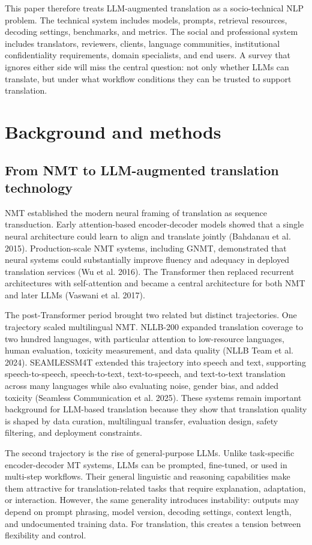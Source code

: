 \documentclass[11pt]{article}
\begin{document}
This paper therefore treats LLM-augmented translation as a socio-technical NLP problem. The technical system includes models, prompts, retrieval resources, decoding settings, benchmarks, and metrics. The social and professional system includes translators, reviewers, clients, language communities, institutional confidentiality requirements, domain specialists, and end users. A survey that ignores either side will miss the central question: not only whether LLMs can translate, but under what workflow conditions they can be trusted to support translation.


\section{Background and methods}
\subsection{From NMT to LLM-augmented translation technology}
NMT established the modern neural framing of translation as sequence transduction. Early attention-based encoder-decoder models showed that a single neural architecture could learn to align and translate jointly (Bahdanau et al. 2015). Production-scale NMT systems, including GNMT, demonstrated that neural systems could substantially improve fluency and adequacy in deployed translation services (Wu et al. 2016). The Transformer then replaced recurrent architectures with self-attention and became a central architecture for both NMT and later LLMs (Vaswani et al. 2017).

The post-Transformer period brought two related but distinct trajectories. One trajectory scaled multilingual NMT. NLLB-200 expanded translation coverage to two hundred languages, with particular attention to low-resource languages, human evaluation, toxicity measurement, and data quality (NLLB Team et al. 2024). SEAMLESSM4T extended this trajectory into speech and text, supporting speech-to-speech, speech-to-text, text-to-speech, and text-to-text translation across many languages while also evaluating noise, gender bias, and added toxicity (Seamless Communication et al. 2025). These systems remain important background for LLM-based translation because they show that translation quality is shaped by data curation, multilingual transfer, evaluation design, safety filtering, and deployment constraints.

The second trajectory is the rise of general-purpose LLMs. Unlike task-specific encoder-decoder MT systems, LLMs can be prompted, fine-tuned, or used in multi-step workflows. Their general linguistic and reasoning capabilities make them attractive for translation-related tasks that require explanation, adaptation, or interaction. However, the same generality introduces instability: outputs may depend on prompt phrasing, model version, decoding settings, context length, and undocumented training data. For translation, this creates a tension between flexibility and control.
\end{document}
